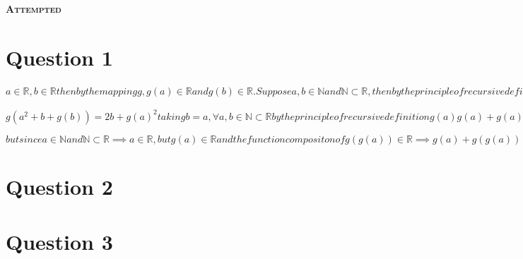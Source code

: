 \documentclass[a4paper, 12pt]{article}
\begin{document}
\begin{center}
    \fontsize{24pt}{10pt}\selectfont
    \textsc{\textbf{Attempted}}
\end{center}

\section{Question 1}
$
a  \in  \mathbb{R}, b  \in  \mathbb{R} then by  the mapping g , g(a)  \in \mathbb{R} and
g(b) \in \mathbb{R}. Suppose a,b \in \mathbb{N} and \mathbb{N} \subset \mathbb{R}, 
then by the principle of recursive definition there exists a function \phi such that
\phi(a + b) = \phi(a) + \phi(b) and \phi(ab) = \phi(a)\phi(b).
If a = b , then g(a)^2 \equiv g(a)g(a) \equiv g(a^2)  and g(a^2 + a + g(a)) \equiv g(a^2)  + g(a) + g(g(a)).
Then proceeding with contradiction taking from the problem we have:
$
\begin{center}
    $
    g(a^2 + b + g(b)) = 2b + g(a)^2
    taking b = a, \forall a,b \in \mathbb{N} \subset\mathbb{R}
    by the principle of recursive definition
    g(a)g(a) + g(a) + g(g(a)) = 2a + g(a)g(a)
    g(a) + g(g(a)) = 2a
    $
\end{center}
$
but since a \in \mathbb{N} and \mathbb{N} \subset \mathbb{R} \implies  a \in \mathbb{R}, 
but g(a) \in \mathbb{R} and the function compositon of g(g(a)) \in \mathbb{R} \implies g(a) + g(g(a))\neq 2a
since the scaling a by 2 where 2 , a \in\mathbb{N} does not imply equality despite \mathbb{N} \subset \mathbb{R}
this contradiction it makes the function g:\mathbb{R}\longrightarrow \mathbb{R}  undefined in the ordered field \mathbb{R}
completes the proof. \blacksquare
$
\newpage

\section{Question 2}

\newpage

\section{Question 3}
\end{document}
